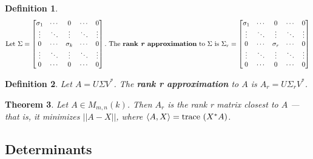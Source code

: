 \documentclass{article}
\theoremstyle{colontheorem}
\newtheorem{theorem}{Theorem}[section]
\newtheorem{definition}[theorem]{Definition}
\newenvironment{Theorem}
{
	\begin{mdframed}[backgroundcolor=TheoremOrange!10]
	\begin{theorem}
}
{
	\end{theorem}
	\end{mdframed}
	
	\vspace{.15in}
}
\newenvironment{Def}
{
	\begin{mdframed}[backgroundcolor=DefGreen!10]
	\begin{definition}
}
{
	\end{definition}
	\end{mdframed}
	
	\vspace{.15in}
}
\begin{document}
\begin{Def}
	
	$$
		\textnormal{Let}\ \Sigma = \begin{bmatrix}
			\sigma_1 & \cdots & 0 & \cdots & 0\\
			\vdots & \ddots & \vdots & \ddots & \vdots\\
			0 & \cdots & \sigma_k & \cdots & 0\\
			\vdots & \ddots & \vdots & \ddots & \vdots\\
			0 & \cdots & 0 & \cdots & 0
		\end{bmatrix}.\ \textnormal{The \textbf{rank \emph{r} approximation} to}\ \Sigma\ \textnormal{is}\ \Sigma_r = \begin{bmatrix}
			\sigma_1 & \cdots & 0 & \cdots & 0\\
			\vdots & \ddots & \vdots & \ddots & \vdots\\
			0 & \cdots & \sigma_r & \cdots & 0\\
			\vdots & \ddots & \vdots & \ddots & \vdots\\
			0 & \cdots & 0 & \cdots & 0
		\end{bmatrix}
	$$
	
\end{Def}



\begin{Def}
	
	Let $A = U \Sigma V^*$. The \textbf{rank \emph{r} approximation} to $A$ is $A_r = U \Sigma_r V^*$.
	
\end{Def}



\begin{Theorem}
	
	Let $A \in M_{m, n}(k)$. Then $A_r$ is the rank r matrix closest to $A$ --- that is, it minimizes $||A - X||$, where $\left< A, X \right> = \textnormal{trace}\ (X^* A)$.
	
\end{Theorem}



\begin{center}
	\pagebreak
	
	\section{Determinants}
	
	\vspace{.1in}
\end{center}
\end{document}
